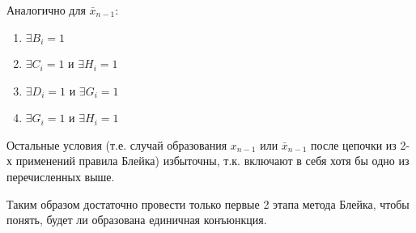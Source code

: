 \documentclass[12pt,a4paper,oneside,fleqn,leqno]{article}
\theoremstyle{definition}
\begin{document}
		\hfill
		\begin{minipage}[t]{0.4\textwidth}
		Аналогично для $\bar{x}_{n - 1}$:
		\begin{enumerate}
			\item
			$\exists B_i = 1$
			\item
			$\exists C_i = 1$ и $\exists H_i = 1$
			\item
			$\exists D_i = 1$ и $\exists G_i = 1$
			\item
			$\exists G_i = 1$ и $\exists H_i = 1$
		\end{enumerate}
		\end{minipage}
		Остальные условия (т.е. случай образования $x_{n - 1}$ или $\bar{x}_{n - 1}$ после цепочки из 2-х применений правила Блейка) избыточны, т.к. включают в себя хотя бы одно из перечисленных выше.\par
		Таким образом достаточно провести только первые 2 этапа метода Блейка, чтобы понять, будет ли образована единичная конъюнкция.
\newpage


  


\end{document}
